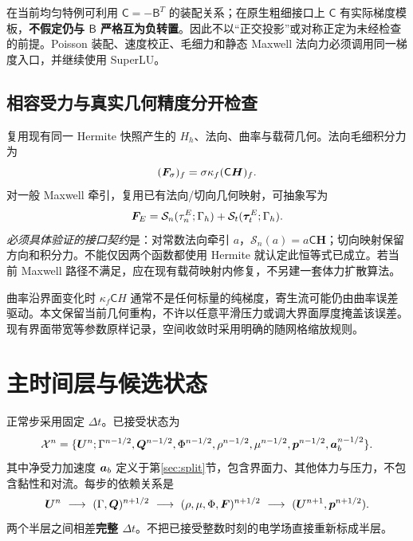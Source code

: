 \documentclass[UTF8,a4paper,11pt,fontset=fandol]{ctexart}
\numberwithin{equation}{section}
\newcommand{\dt}{\Delta t}\newcommand{\dd}{\,\mathrm d}
\newcommand{\QQ}{\bm Q}\newcommand{\pp}{\bm p}\newcommand{\EE}{\bm E}
\newcommand{\mat}[1]{\mathsf{#1}}\newcommand{\code}[1]{\nolinkurl{#1}}
\begin{document}
在当前均匀特例可利用 $\mat C=-\mat B^T$ 的装配关系；在原生粗细接口上 $\mat C$ 有实际梯度模板，\textbf{不假定仍与 $\mat B$ 严格互为负转置}。因此不以“正交投影”或对称正定为未经检查的前提。Poisson 装配、速度校正、毛细力和静态 Maxwell 法向力必须调用同一梯度入口，并继续使用 SuperLU。

\subsection{相容受力与真实几何精度分开检查}
复用现有同一 Hermite 快照产生的 $H_h$、法向、曲率与载荷几何。法向毛细积分力为
\begin{equation}
 (\FF_\sigma)_f=\sigma\kappa_f(\mat C\bm H)_f.\label{eq:cap}
\end{equation}
对一般 Maxwell 牵引，复用已有法向/切向几何映射，可抽象写为
\begin{equation}
 \bm F_E=\mathcal S_n(\tau_n^E;\Gamma_h)+\mathcal S_t(\bm\tau_t^E;\Gamma_h).
\end{equation}
\emph{必须具体验证的接口契约}是：对常数法向牵引 $a$，$\mathcal S_n(a)=a\mat C\bm H$；切向映射保留方向和积分力。不能仅因两个函数都使用 Hermite 就认定此恒等式已成立。若当前 Maxwell 路径不满足，应在现有载荷映射内修复，不另建一套体力扩散算法。

曲率沿界面变化时 $\kappa_f\mat C H$ 通常不是任何标量的纯梯度，寄生流可能仍由曲率误差驱动。本文保留当前几何重构，不许以任意平滑压力或调大界面厚度掩盖该误差。现有界面带宽等参数原样记录，空间收敛时采用明确的随网格缩放规则。

\section{主时间层与候选状态}
正常步采用固定 $\dt$。已接受状态为
\begin{equation}
 \mathcal X^n=\{\UU^n;\Gamma^{n-1/2},\QQ^{n-1/2},\Phi^{n-1/2},
 \rho^{n-1/2},\mu^{n-1/2},\pp^{n-1/2},\acc_b^{n-1/2}\}.
\end{equation}
其中净受力加速度 $\bm a_b$ 定义于第\ref{sec:split}节，包含界面力、其他体力与压力，不包含黏性和对流。每步的依赖关系是
\begin{equation}
 \UU^n\ \longrightarrow\ (\Gamma,\QQ)^{n+1/2}
 \ \longrightarrow\ (\rho,\mu,\Phi,\FF)^{n+1/2}
 \ \longrightarrow\ (\UU^{n+1},\pp^{n+1/2}).\label{eq:clock}
\end{equation}
两个半层之间相差\textbf{完整 $\dt$}。不把已接受整数时刻的电学场直接重新标成半层。
\end{document}
